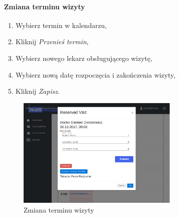 \documentclass[polish,12pt]{aghthesis}
\begin{document}
    \paragraph{Zmiana terminu wizyty}{
      \begin{enumerate}
        \item Wybierz termin w kalendarzu,
        \item Kliknij \emph{Przenieś termin},
        \item Wybierz nowego lekarz obsługującego wizytę,
        \item Wybierz nową datę rozpoczęcia i zakończenia wizyty,
        \item Kliknij \emph{Zapisz}.
      \end{enumerate}
        \begin{figure}[H]
        \includegraphics[width=0.7\textwidth]{gui-recep-moveslot}
        \caption{Zmiana terminu wizyty}
        \end{figure} 
    }
\end{document}
